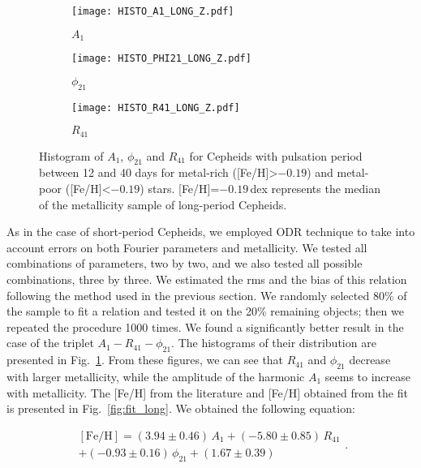 \documentclass[article]{aa} %
\begin{document}
\begin{figure} %
\begin{subfigure}{0.50\textwidth}
\texttt{[image: HISTO\_A1\_LONG\_Z.pdf]}
\caption{$A_1$}
\end{subfigure}\hspace*{\fill}

\begin{subfigure}{0.50\textwidth}
\texttt{[image: HISTO\_PHI21\_LONG\_Z.pdf]}
\caption{$\phi_{21}$} 
\end{subfigure}

\begin{subfigure}{0.50\textwidth}
\texttt{[image: HISTO\_R41\_LONG\_Z.pdf]}
\caption{$R_{41}$} 
\end{subfigure}
\caption{\small Histogram of $A_1$, $\phi_{21}$ and $R_{41}$ for Cepheids with pulsation period between 12 and 40 days for metal-rich ([Fe/H]>$-0.19$) and metal-poor ([Fe/H]<$-0.19$) stars. [Fe/H]=$-0.19\,$dex represents the median of the metallicity sample of long-period Cepheids.}\label{fig:histo_long}
\end{figure}



As in the case of short-period Cepheids, we employed ODR technique to take into account errors on both Fourier parameters and metallicity. We tested all combinations of parameters, two by two, and we also tested all possible combinations, three by three. We estimated the rms and the bias of this relation following the method used in the previous section. We randomly selected  80\% of the sample to fit a relation and tested it on the 20\% remaining objects; then we repeated the procedure 1000 times. We found a significantly better result in the case of the triplet $A_1-R_{41}-\phi_{21}$. The histograms of their distribution are presented in Fig.~\ref{fig:histo_long}. From these figures, we can see that $R_{41}$ and $\phi_{21}$ decrease with larger metallicity, while the amplitude of the harmonic $A_1$ seems to increase with metallicity. The [Fe/H] from the literature and [Fe/H] obtained from the fit is presented in Fig.~\ref{fig:fit_long}. We obtained the following equation:

\begin{equation}
\begin{split}
    [\mathrm{Fe/H}]=(3.94\pm0.46)\,A_1+(-5.80\pm0.85)\,R_{41}\\
    +(-0.93\pm0.16)\,\phi_{21} + (1.67\pm0.39)
\end{split}\label{eq:LONG_eq}
.\end{equation}
\end{document}
